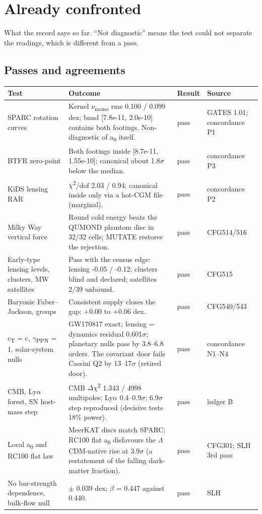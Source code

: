 \documentclass[10pt]{article}
\begin{document}
\section{Already confronted}
What the record says so far. ``Not diagnostic'' means the test could not separate the readings, which is different from a pass.

\subsection*{Passes and agreements}
{\footnotesize\begin{longtable}{>{\raggedright\arraybackslash}p{4.4cm}>{\raggedright\arraybackslash}p{11.6cm}>{\raggedright\arraybackslash}p{2.0cm}>{\raggedright\arraybackslash}p{3.4cm}}
\toprule\textbf{Test} & \textbf{Outcome} & \textbf{Result} & \textbf{Source}\\\midrule\endhead
SPARC rotation curves & Kernel \ensuremath{\nu}\textsubscript{mono} rms 0.100 / 0.099 dex; band [7.8e-11, 2.0e-10] contains both footings. Non-diagnostic of a\textsubscript{0} itself. & pass & GATES 1.01; concordance P1 \\
BTFR zero-point & Both footings inside [8.7e-11, 1.55e-10]; canonical about 1.8\ensuremath{\sigma} below the median. & pass & concordance P3 \\
KiDS lensing RAR & \ensuremath{\chi}\textsuperscript{2}/dof 2.03 / 0.94; canonical inside only via a hot-CGM file (marginal). & pass & concordance P2 \\
Milky Way vertical force & Round cold energy beats the QUMOND phantom disc in 32/32 cells; MUTATE restores the rejection. & pass & CFG514/516 \\
Early-type lensing levels, clusters, MW satellites & Pass with the census edge: lensing -0.05 / -0.12; clusters blind and declared; satellites 2/39 unbound. & pass & CFG515 \\
Baryonic Faber--Jackson, groups & Consistent supply closes the gap: +0.00 to +0.06 dex. & pass & CFG540/543 \\
c\textsubscript{T} = c, \ensuremath{\gamma}\textsubscript{PPN} = 1, solar-system nulls & GW170817 exact; lensing = dynamics residual 0.601\ensuremath{\sigma}; planetary nulls pass by 3.8--6.8 orders. The covariant door fails Cassini Q2 by 13--17\ensuremath{\sigma} (retired door). & pass & concordance N1--N4 \\
CMB, Ly\ensuremath{\alpha} forest, SN host-mass step & CMB \ensuremath{\Delta}\ensuremath{\chi}\textsuperscript{2} 1.343 / 4998 multipoles; Ly\ensuremath{\alpha} 0.4--0.9\ensuremath{\sigma}; 6.9\ensuremath{\sigma} step reproduced (decisive tests 18\% power). & pass & ledger B \\
Local a\textsubscript{0} and RC100 flat law & 47 MeerKAT discs match SPARC; RC100 flat a\textsubscript{0} disfavours the \ensuremath{\Lambda}CDM-native rise at 3.9\ensuremath{\sigma} (a restatement of the falling dark-matter fraction). & pass & CFG301; SLH 3rd pass \\
No bar-strength dependence, bulk-flow null & -0.026 \ensuremath{\pm} 0.039 dex; \ensuremath{\beta} = 0.447 against 0.440. & pass & SLH \\
\bottomrule\end{longtable}}
\end{document}
